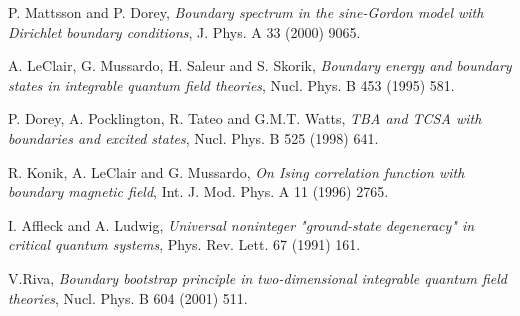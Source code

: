 \documentclass[a4paper,12pt]{report}
\begin{document}
\begin{thebibliography}{23}
 P. Mattsson and P. Dorey, \textit{Boundary spectrum in the sine-Gordon model with Dirichlet boundary conditions}, J. Phys. A 33 (2000) 9065.

 A. LeClair, G. Mussardo, H. Saleur and S. Skorik, \textit{Boundary energy and boundary states in integrable quantum field theories}, Nucl. Phys. B 453 (1995) 581.

 P. Dorey, A. Pocklington, R. Tateo and G.M.T. Watts, \textit{TBA and TCSA with boundaries and excited states}, Nucl. Phys. B 525 (1998) 641.

 R. Konik, A. LeClair and G. Mussardo, \textit{On Ising correlation function with boundary magnetic field}, Int. J. Mod. Phys. A 11 (1996) 2765.

 I. Affleck and A. Ludwig, {\it Universal noninteger "ground-state degeneracy" in critical quantum systems},
Phys. Rev. Lett. 67 (1991) 161.

 V.Riva, \textit{Boundary bootstrap principle in two-dimensional integrable quantum field theories},
Nucl. Phys. B 604 (2001) 511.


\end{thebibliography}
\end{document}
